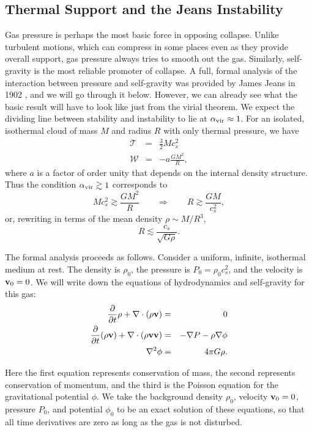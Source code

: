 \subsection{Thermal Support and the Jeans Instability}

Gas pressure is perhaps the most basic force in opposing collapse. Unlike turbulent motions, which can compress in some places even as they provide overall support, gas pressure always tries to smooth out the gas. Similarly, self-gravity is the most reliable promoter of collapse. A full, formal analysis of the interaction between pressure and self-gravity was provided by James Jeans in 1902 \citep{jeans02a}, and we will go through it below. However, we can already see what the basic result will have to look like just from the virial theorem. We expect the dividing line between stability and instability to lie at $\alpha_{\rm vir} \approx 1$. For an isolated, isothermal cloud of mass $M$ and radius $R$ with only thermal pressure, we have
\begin{eqnarray}
\mathcal{T} & = & \frac{3}{2} M c_s^2 \\
\mathcal{W} & = & -a \frac{GM^2}{R},
\end{eqnarray}
where $a$ is a factor of order unity that depends on the internal density structure. Thus the condition $\alpha_{\rm vir} \gtrsim 1$ corresponds to
\begin{equation}
M c_s^2 \gtrsim \frac{GM^2}{R} \qquad\Longrightarrow\qquad R \gtrsim \frac{GM}{c_s^2},
\end{equation}
or, rewriting in terms of the mean density $\rho \sim M/R^3$,
\begin{equation}
R \lesssim \frac{c_s}{\sqrt{G\rho}}.
\end{equation}

The formal analysis proceeds as follows. Consider a uniform, infinite, isothermal medium at rest. The density is $\rho_0$, the pressure is $P_0 = \rho_0 c_s^2$, and the velocity is $\mathbf{v}_0 = 0$. We will write down the equations of hydrodynamics and self-gravity for this gas:
\begin{eqnarray}
\frac{\partial}{\partial t}\rho + \nabla\cdot (\rho \mathbf{v}) & = & 0 \\
\frac{\partial}{\partial t}(\rho\mathbf{v}) + \nabla\cdot(\rho \mathbf{v}\mathbf{v}) & = & -\nabla P - \rho \nabla \phi \\
\nabla^2 \phi & = & 4\pi G\rho.
\end{eqnarray}

Here the first equation represents conservation of mass, the second represents conservation of momentum, and the third is the Poisson equation for the gravitational potential $\phi$. We take the background density $\rho_0$, velocity $\mathbf{v}_0 = 0$, pressure $P_0$, and potential $\phi_0$ to be an exact solution of these equations, so that all time derivatives are zero as long as the gas is not disturbed.

